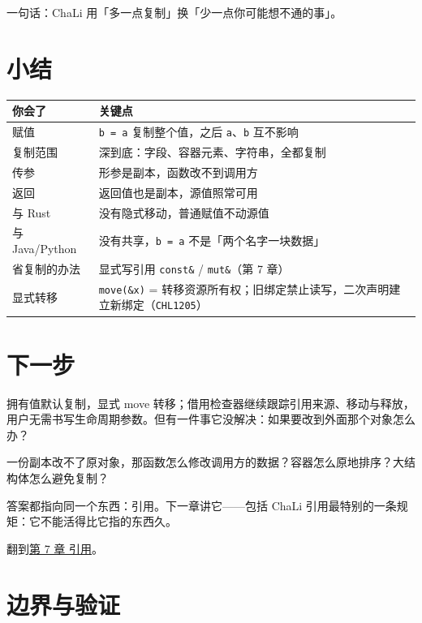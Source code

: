 一句话：ChaLi 用「多一点复制」换「少一点你可能想不通的事」。

\section{小结}

{\small\setlength{\tabcolsep}{4pt}
\begin{longtable}{>{\raggedright\arraybackslash}p{}>{\raggedright\arraybackslash}p{}}
\toprule
你会了 & 关键点 \\
\midrule
\endhead
赋值 & \texttt{b =\allowbreak{} a} 复制整个值，之后 \texttt{a}、\texttt{b} 互不影响 \\
复制范围 & 深到底：字段、容器元素、字符串，全都复制 \\
传参 & 形参是副本，函数改不到调用方 \\
返回 & 返回值也是副本，源值照常可用 \\
与 Rust & 没有隐式移动，普通赋值不动源值 \\
与 Java/Python & 没有共享，\texttt{b =\allowbreak{} a} 不是「两个名字一块数据」 \\
省复制的办法 & 显式写引用 \texttt{const\&} / \texttt{mut\&}（第 7 章） \\
显式转移 & \texttt{move(\allowbreak{}\&x)\allowbreak{}} = 转移资源所有权；旧绑定禁止读写，二次声明建立新绑定（\texttt{CHL1205}） \\
\bottomrule
\end{longtable}
}

\section{下一步}

拥有值默认复制，显式 move 转移；借用检查器继续跟踪引用来源、移动与释放，用户无需书写生命周期参数。但有一件事它没解决：如果要改到外面那个对象怎么办？

一份副本改不了原对象，那函数怎么修改调用方的数据？容器怎么原地排序？大结构体怎么避免复制？

答案都指向同一个东西：引用。下一章讲它——包括 ChaLi 引用最特别的一条规矩：它不能活得比它指的东西久。

翻到\hyperref[ch:07]{第 7 章 引用}。

\section{边界与验证}

